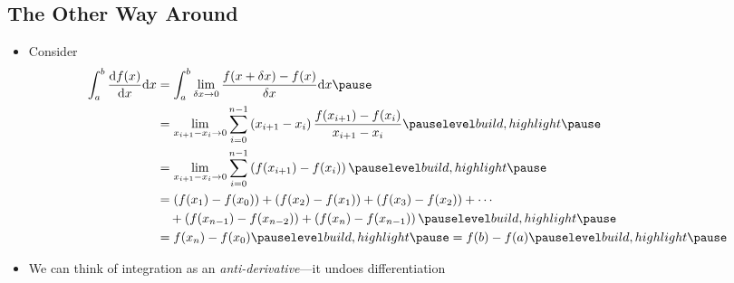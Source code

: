 \begin{slide}
 \section[-2]{The Other Way Around}

  \begin{PauseHighLight}
  \begin{itemize}
  \item Consider
    {\small
    \begin{align*}
      \int_a^b \frac{\dd f(x)}{\dd x} \dd x
      &= \int_a^b  \lim_{\delta x\rightarrow 0} \frac{f(x+\delta x) -
        f(x)}{\delta x} \dd x \pause\\
      &= \lim_{x_{i+1}-x_i\rightarrow 0}  \sum_{i=0}^{n-1} \bra{x_{i+1}- x_i} \frac{f(x_{i+1})
        - f(x_i)}{x_{i+1}- x_i}\pauseb\\
      &=  \lim_{x_{i+1}-x_i\rightarrow 0}  \sum_{i=0}^{n-1} \bra{f(x_{i+1})
        - f(x_i)}\pauseb\\
      &= \bra{f(x_1)- f(x_0)} + \bra{f(x_2)- f(x_1)} + \bra{f(x_3)-
        f(x_2)} + \cdots \\
      & \quad + \bra{f(x_{n-1})- f(x_{n-2})} + \bra{f(x_n)-
        f(x_{n-1})} \pauseb \\
      &= f(x_n) - f(x_0)\pauseb = f(b) -f(a)\pauseb
    \end{align*}}
  \item We can think of integration as an \emph{anti-derivative}---it
    undoes differentiation\pauseb
  \end{itemize}
\end{PauseHighLight}

\end{slide}


